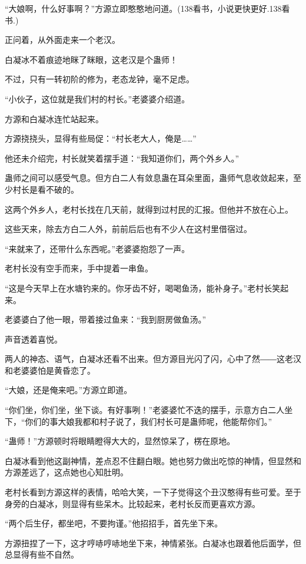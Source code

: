 
\begin{this_body}

“大娘啊，什么好事啊？”方源立即憨憨地问道。(138看书，小说更快更好.138看书.)

正问着，从外面走来一个老汉。

白凝冰不着痕迹地眯了眯眼，这老汉是个蛊师！

不过，只有一转初阶的修为，老态龙钟，毫不足虑。

“小伙子，这位就是我们村的村长。”老婆婆介绍道。

方源和白凝冰连忙站起来。

方源挠挠头，显得有些局促：“村长老大人，俺是……”

他还未介绍完，村长就笑着摆手道：“我知道你们，两个外乡人。”

蛊师之间可以感受气息。但方白二人有敛息蛊在耳朵里面，蛊师气息收敛起来，至少村长是看不破的。

这两个外乡人，老村长找在几天前，就得到过村民的汇报。但他并不放在心上。

这些天来，除去方白二人外，前前后后也有不少人在这村里借宿过。

“来就来了，还带什么东西呢。”老婆婆抱怨了一声。

老村长没有空手而来，手中提着一串鱼。

“这是今天早上在水塘钓来的。你牙齿不好，喝喝鱼汤，能补身子。”老村长笑起来。

老婆婆白了他一眼，带着接过鱼来：“我到厨房做鱼汤。”

声音透着喜悦。

两人的神态、语气，白凝冰还看不出来。但方源目光闪了闪，心中了然――这老汉和老婆婆怕是黄昏恋了。

“大娘，还是俺来吧。”方源立即道。

“你们坐，你们坐，坐下谈。有好事咧！”老婆婆忙不迭的摆手，示意方白二人坐下，“你们的事大娘我都和村子说了，我们村长可是蛊师呢，他能帮你们。”

“蛊师！”方源顿时将眼睛瞪得大大的，显然惊呆了，楞在原地。

白凝冰看到他这副神情，差点忍不住翻白眼。她也努力做出吃惊的神情，但显然和方源差远了，这点她也心知肚明。

老村长看到方源这样的表情，哈哈大笑，一下子觉得这个丑汉憨得有些可爱。至于身旁的白凝冰，则显得有些呆木。比较起来，老村长反而更喜欢方源。

“两个后生仔，都坐吧，不要拘谨。”他招招手，首先坐下来。

方源扭捏了一下，这才哼哧哼哧地坐下来，神情紧张。白凝冰也跟着他后面学，但总显得有些不自然。


\end{this_body}
